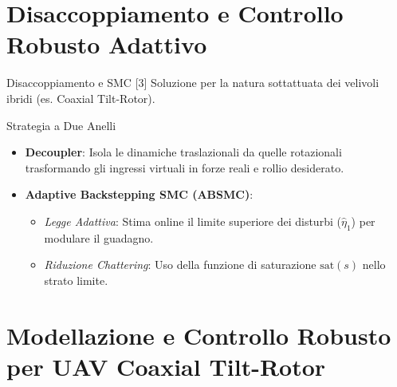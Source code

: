 \documentclass[aspectratio=169]{beamer}
\begin{document}
\section{Disaccoppiamento e Controllo Robusto Adattivo}

\begin{frame}{Disaccoppiamento e SMC [3]}
    Soluzione per la natura sottattuata dei velivoli ibridi (es. Coaxial Tilt-Rotor).
    \vspace{0.3cm}
    \begin{block}{Strategia a Due Anelli}
        \begin{itemize}
            \item \textbf{Decoupler}: Isola le dinamiche traslazionali da quelle rotazionali trasformando gli ingressi virtuali in forze reali e rollio desiderato.
            \item \textbf{Adaptive Backstepping SMC (ABSMC)}:
            \begin{itemize}
                \item \textit{Legge Adattiva}: Stima online il limite superiore dei disturbi ($\hat{\eta}_1$) per modulare il guadagno.
                \item \textit{Riduzione Chattering}: Uso della funzione di saturazione $\text{sat}(s)$ nello strato limite.
            \end{itemize}
        \end{itemize}
    \end{block}
\end{frame}

\section{Modellazione e Controllo Robusto per UAV Coaxial Tilt-Rotor}
\end{document}
